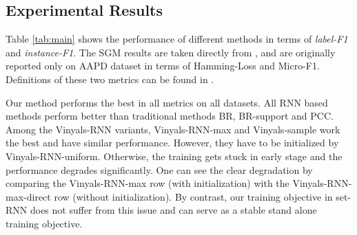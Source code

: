 

\subsection{Experimental Results}
Table \ref{tab:main} shows the performance of different methods in terms of \emph{label-F1} and \emph{instance-F1}. The SGM results are taken directly from \cite{DBLP:journals/corr/abs-1806-04822}, and are originally reported only on AAPD dataset in terms of Hamming-Loss and Micro-F1. Definitions of these two metrics can be found in \cite{koyejo2015consistent}.  

 
Our method performs the best in all metrics on all datasets.  All RNN based methods perform better than traditional methods BR, BR-support and PCC. Among the Vinyals-RNN variants, Vinyals-RNN-max and Vinyals-sample work the best and have similar performance. However, they have to be initialized by Vinyals-RNN-uniform. Otherwise, the training gets stuck in early stage and the performance degrades significantly. One can see the clear degradation by comparing the Vinyals-RNN-max row (with initialization) with the Vinyals-RNN-max-direct row (without initialization). By contrast, our training objective in set-RNN does not suffer from this issue and can serve as a stable stand alone training objective.

